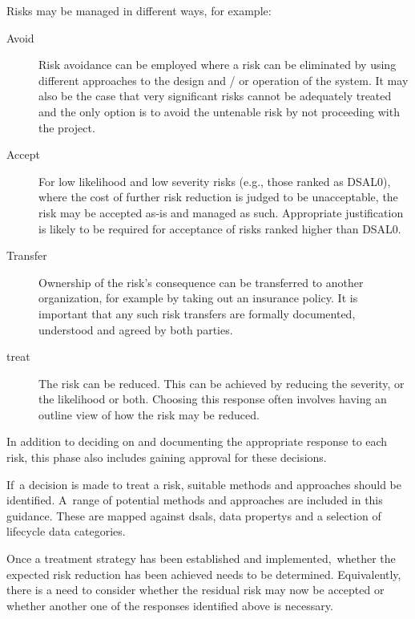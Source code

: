 Risks may be managed in different ways, for example:

\begin{description}
  \item[Avoid]Risk avoidance can be employed where a risk can be eliminated by using different approaches to the design and / or operation of the system. It may also be the case that very significant risks cannot be adequately treated and the only option is to avoid the untenable risk by not proceeding with the project.
  \item[Accept]For low likelihood and low severity risks (e.g., those ranked as DSAL0), where the cost of further risk reduction is judged to be unacceptable, the risk may be accepted as-is and managed as such. Appropriate justification is likely to be required for acceptance of risks ranked higher than DSAL0.
  \cbstart\item[Transfer]Ownership of the risk's consequence can be transferred to another organization, for example by taking out an insurance policy. It is important that any such risk transfers are formally documented, understood and agreed by both parties.
  \item[\Gls{treat}]The risk can be reduced. This can be achieved by reducing the severity, or the likelihood or both. Choosing this \gls{response} often involves having an outline view of how the risk may be reduced. \cbend\
\end{description}

In addition to deciding on and documenting the appropriate \gls{response} to each risk, this phase also includes gaining approval for these decisions.

\cbstart If\cbend\ a decision is made to \gls{treat} a risk, suitable methods and approaches should be identified. \cbstart A\cbend\ range of potential methods and approaches are included in this guidance. These are mapped against \glspl{dsal}, \glspl{data property} and a selection of lifecycle data categories.

Once a \gls{treatment} strategy has been established and implemented,\cbstart\ whether the expected risk reduction has been achieved needs to be determined\cbend. Equivalently, there is a need to consider whether the residual risk may now be accepted \cbstart or whether another one of the \glspl{response} identified above is necessary\cbend.

